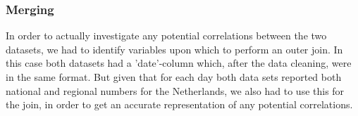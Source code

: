 \subsubsection{Merging}
In order to actually investigate any potential correlations between the two datasets, we had to identify variables upon which to perform an outer join. In this case both datasets had a 'date'-column which, after the data cleaning, were in the same format. But given that for each day both data sets reported both national and regional numbers for the Netherlands, we also had to use this for the join, in order to get an accurate representation of any potential correlations. 




